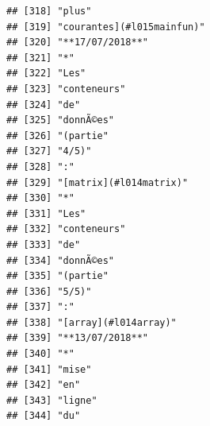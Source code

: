 \documentclass[]{book}
\begin{document}
\begin{verbatim}
## [318] "plus"                                                                                   
## [319] "courantes](#l015mainfun)"                                                               
## [320] "**17/07/2018**"                                                                         
## [321] "*"                                                                                      
## [322] "Les"                                                                                    
## [323] "conteneurs"                                                                             
## [324] "de"                                                                                     
## [325] "donnÃ©es"                                                                               
## [326] "(partie"                                                                                
## [327] "4/5)"                                                                                   
## [328] ":"                                                                                      
## [329] "[matrix](#l014matrix)"                                                                  
## [330] "*"                                                                                      
## [331] "Les"                                                                                    
## [332] "conteneurs"                                                                             
## [333] "de"                                                                                     
## [334] "donnÃ©es"                                                                               
## [335] "(partie"                                                                                
## [336] "5/5)"                                                                                   
## [337] ":"                                                                                      
## [338] "[array](#l014array)"                                                                    
## [339] "**13/07/2018**"                                                                         
## [340] "*"                                                                                      
## [341] "mise"                                                                                   
## [342] "en"                                                                                     
## [343] "ligne"                                                                                  
## [344] "du"                                                                                     

\end{verbatim}
\end{document}
